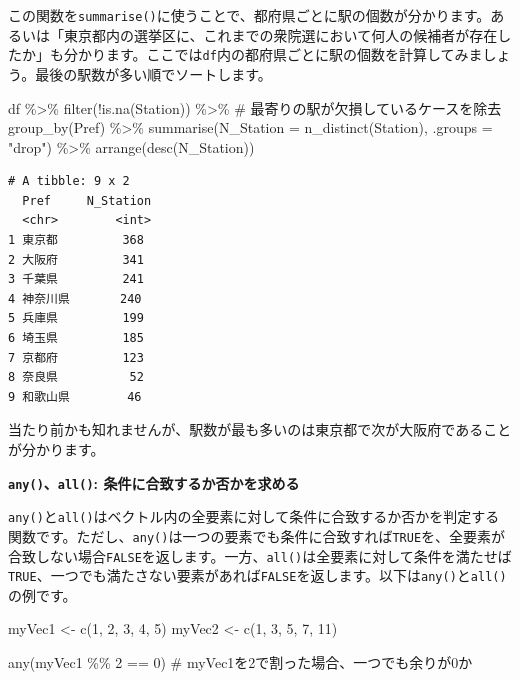 \documentclass[
  a4paper,
  pandoc,
  ja=standard,
  jafont=haranoaji]{bxjsbook}
\newenvironment{Shaded}{\begin{snugshade}}{\end{snugshade}}
\newcommand{\AttributeTok}[1]{\textcolor[rgb]{0.00,0.48,0.65}{#1}}
\newcommand{\CommentTok}[1]{\textcolor[rgb]{0.37,0.37,0.37}{#1}}
\newcommand{\DecValTok}[1]{\textcolor[rgb]{0.68,0.00,0.00}{#1}}
\newcommand{\FunctionTok}[1]{\textcolor[rgb]{0.28,0.35,0.67}{#1}}
\newcommand{\NormalTok}[1]{\textcolor[rgb]{0.00,0.48,0.65}{#1}}
\newcommand{\OtherTok}[1]{\textcolor[rgb]{0.00,0.48,0.65}{#1}}
\newcommand{\SpecialCharTok}[1]{\textcolor[rgb]{0.37,0.37,0.37}{#1}}
\newcommand{\StringTok}[1]{\textcolor[rgb]{0.13,0.47,0.30}{#1}}
\begin{document}
この関数を\texttt{summarise()}に使うことで、都府県ごとに駅の個数が分かります。あるいは「東京都内の選挙区に、これまでの衆院選において何人の候補者が存在したか」も分かります。ここでは\texttt{df}内の都府県ごとに駅の個数を計算してみましょう。最後の駅数が多い順でソートします。

\begin{Shaded}
\begin{Highlighting}[numbers=left,,]
\NormalTok{df }\SpecialCharTok{\%\textgreater{}\%}
  \FunctionTok{filter}\NormalTok{(}\SpecialCharTok{!}\FunctionTok{is.na}\NormalTok{(Station)) }\SpecialCharTok{\%\textgreater{}\%} \CommentTok{\# 最寄りの駅が欠損しているケースを除去}
  \FunctionTok{group\_by}\NormalTok{(Pref) }\SpecialCharTok{\%\textgreater{}\%}
  \FunctionTok{summarise}\NormalTok{(}\AttributeTok{N\_Station =} \FunctionTok{n\_distinct}\NormalTok{(Station),}
            \AttributeTok{.groups   =} \StringTok{"drop"}\NormalTok{) }\SpecialCharTok{\%\textgreater{}\%}
  \FunctionTok{arrange}\NormalTok{(}\FunctionTok{desc}\NormalTok{(N\_Station))}
\end{Highlighting}
\end{Shaded}

\begin{verbatim}
# A tibble: 9 x 2
  Pref     N_Station
  <chr>        <int>
1 東京都         368
2 大阪府         341
3 千葉県         241
4 神奈川県       240
5 兵庫県         199
6 埼玉県         185
7 京都府         123
8 奈良県          52
9 和歌山県        46
\end{verbatim}

当たり前かも知れませんが、駅数が最も多いのは東京都で次が大阪府であることが分かります。

\textbf{\texttt{any()}、\texttt{all()}: 条件に合致するか否かを求める}

\texttt{any()}と\texttt{all()}はベクトル内の全要素に対して条件に合致するか否かを判定する関数です。ただし、\texttt{any()}は一つの要素でも条件に合致すれば\texttt{TRUE}を、全要素が合致しない場合\texttt{FALSE}を返します。一方、\texttt{all()}は全要素に対して条件を満たせば\texttt{TRUE}、一つでも満たさない要素があれば\texttt{FALSE}を返します。以下は\texttt{any()}と\texttt{all()}の例です。

\begin{Shaded}
\begin{Highlighting}[numbers=left,,]
\NormalTok{myVec1 }\OtherTok{\textless{}{-}} \FunctionTok{c}\NormalTok{(}\DecValTok{1}\NormalTok{, }\DecValTok{2}\NormalTok{, }\DecValTok{3}\NormalTok{, }\DecValTok{4}\NormalTok{, }\DecValTok{5}\NormalTok{)}
\NormalTok{myVec2 }\OtherTok{\textless{}{-}} \FunctionTok{c}\NormalTok{(}\DecValTok{1}\NormalTok{, }\DecValTok{3}\NormalTok{, }\DecValTok{5}\NormalTok{, }\DecValTok{7}\NormalTok{, }\DecValTok{11}\NormalTok{)}

\FunctionTok{any}\NormalTok{(myVec1 }\SpecialCharTok{\%\%} \DecValTok{2} \SpecialCharTok{==} \DecValTok{0}\NormalTok{) }\CommentTok{\# myVec1を2で割った場合、一つでも余りが0か}
\end{Highlighting}
\end{Shaded}
\end{document}
